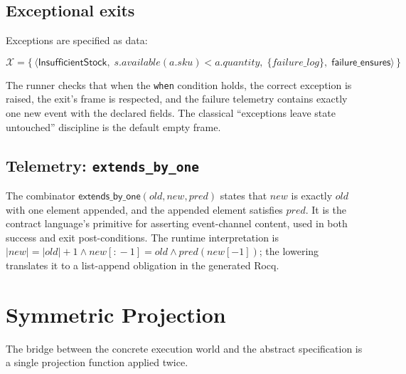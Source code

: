 \documentclass[11pt,a4paper]{article}
\begin{document}
\subsection{Exceptional exits}

Exceptions are specified as data:

\[
\mathcal{X} = \bigl\{\,
\langle \mathsf{InsufficientStock},\;
       s.\mathit{available}(a.\mathit{sku}) < a.\mathit{quantity},\;
       \{\mathit{failure\_log}\},\;
       \mathsf{failure\_ensures}
\rangle \,\bigr\}
\]

The runner checks that when the \texttt{when} condition holds, the
correct exception is raised, the exit's frame is respected, and the
failure telemetry contains exactly one new event with the declared
fields.  The classical ``exceptions leave state untouched'' discipline
is the default empty frame.

\subsection{Telemetry: \texttt{extends\_by\_one}}

The combinator $\mathsf{extends\_by\_one}(\mathit{old}, \mathit{new},
\mathit{pred})$ states that $\mathit{new}$ is exactly $\mathit{old}$
with one element appended, and the appended element satisfies
$\mathit{pred}$.  It is the contract language's primitive for
asserting event-channel content, used in both success and exit
post-conditions.  The runtime interpretation is
$|\mathit{new}| = |\mathit{old}| + 1 \land \mathit{new}[:\!-1] =
\mathit{old} \land \mathit{pred}(\mathit{new}[-1])$; the lowering
translates it to a list-append obligation in the generated Rocq.

\section{Symmetric Projection}\label{sec:architecture}

The bridge between the concrete execution world and the abstract
specification is a single projection function applied twice.
\end{document}
